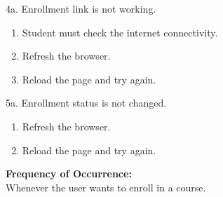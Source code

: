 4a. Enrollment link is not working.
\begin{enumerate}
\item Student must check the internet connectivity.
\item Refresh the browser.
\item Reload the page and try again.
\end{enumerate}
5a. Enrollment status is not changed.
\begin{enumerate}
\item Refresh the browser.
\item Reload the page and try again.
\end{enumerate}
\textbf{Frequency of Occurrence:}\\
Whenever the user wants to enroll in a course.



